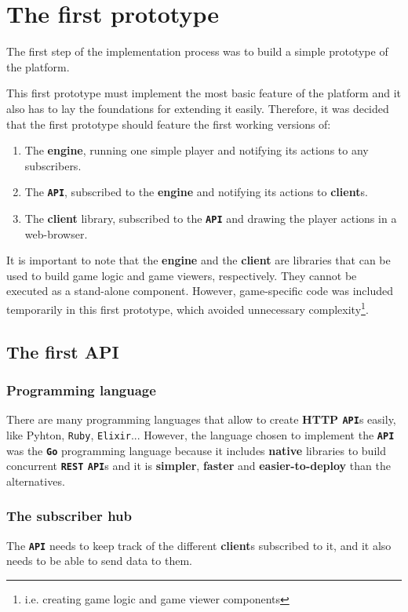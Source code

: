\documentclass[a4paper,11pt,titlepage,abstract,numbers=noenddot,automark,mnsy,intlimits,rgb,dvipsnames]{report}
\begin{document}
\chapter{The first prototype}
The first step of the implementation process was to build a simple prototype of the platform.

This first prototype must implement the most basic feature of the platform and it also has to lay the foundations for extending
it easily. Therefore, it was decided that the first prototype should feature the first working versions of:
\begin{enumerate}
\item
The \textbf{engine}, running one simple player and notifying its actions to any subscribers.
\item
The \textbf{\texttt{API}}, subscribed to the \textbf{engine} and notifying its actions to \textbf{client}s.
\item
The \textbf{client} library, subscribed to the \textbf{\texttt{API}} and drawing the player actions in a web-browser.
\end{enumerate}
It is important to note that the \textbf{engine} and the \textbf{client} are libraries that can be used to build
game logic and game viewers, respectively. They cannot be executed as a stand-alone component. However,
game-specific code was included temporarily in this first prototype, which avoided unnecessary complexity\footnote{i.e.
creating game logic and game viewer components}.
\section{The first API}
\subsection{Programming language}
There are many programming languages that allow to create \textbf{HTTP \texttt{API}}s easily, like Pyhton, \texttt{Ruby}, \texttt{Elixir}... However,
the language chosen to implement the \textbf{\texttt{API}} was the \textbf{\texttt{Go}} programming language because it includes \textbf{native}
libraries to build concurrent \textbf{\texttt{REST} \texttt{API}}s and it is \textbf{simpler}, \textbf{faster} and \textbf{easier-to-deploy} than the alternatives.
\subsection{The subscriber hub}
The \textbf{\texttt{API}} needs to keep track of the different \textbf{client}s subscribed to it, and it also needs to be able to send data
to them.
\end{document}
